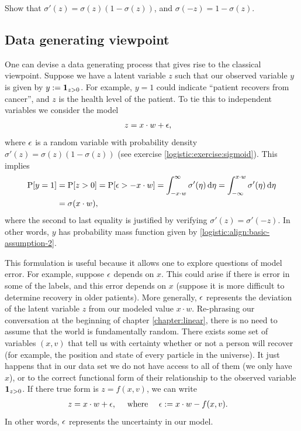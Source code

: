 \begin{exercise}
  \label{logistic:exercise:sigmoid}
  Show that $\sigma'(z) = \sigma(z)(1 - \sigma(z))$, and $\sigma(-z) = 1 - \sigma(z)$.
\end{exercise}

\subsection{Data generating viewpoint}
\label{logistic:subsection:data-generating-viewpoint}
One can devise a data generating process that gives rise to the classical viewpoint.  Suppose we have a latent variable $z$ such that our observed variable $y$ is given by $y := \mathbf{1}_{z>0}$.  For example, $y=1$ could indicate ``patient recovers from cancer'', and $z$ is the health level of the patient.  To tie this to independent variables we consider the model
\begin{align*}
  z &= x\cdot w + {\epsilon},
\end{align*}
where ${\epsilon}$ is a random variable with probability density $\sigma'(z) = \sigma(z)(1 - \sigma(z))$ (see exercise \ref{logistic:exercise:sigmoid}).  This implies
\begin{align*}
  \mathrm{P}[y = 1] &= \mathrm{P}[z > 0] = \mathrm{P}[{\epsilon} > -x\cdot w] = \int_{-x\cdot w}^\infty \sigma'(\eta){\,\mbox{d}}\eta = \int_{-\infty}^{x\cdot w}\sigma'(\eta){\,\mbox{d}}\eta\\
  &= \sigma(x\cdot w),
\end{align*}
where the second to last equality is justified by verifying $\sigma'(z) = \sigma'(-z)$.  In other words, $y$ has probability mass function given by \eqref{logistic:align:basic-assumption-2}.

This formulation is useful because it allows one to explore questions of model error.  For example, suppose ${\epsilon}$ depends on $x$.  This could arise if there is error in some of the labels, and this error depends on $x$ (suppose it is more difficult to determine recovery in older patients).  More generally, ${\epsilon}$ represents the deviation of the latent variable $z$ from our modeled value $x\cdot w$.  Re-phrasing our conversation at the beginning of chapter \ref{chapter:linear}, there is no need to assume that the world is fundamentally random.  There exists some set of variables $(x, v)$ that tell us with certainty whether or not a person will recover (for example, the position and state of every particle in the universe).  It just happens that in our data set we do not have access to all of them (we only have $x$), or to the correct functional form of their relationship to the observed variable $\mathbf{1}_{z>0}$.  If there true form is $z = f(x, v)$, we can write
\begin{align}
  \label{logistic:align:model-error}
  z &= x\cdot w + {\epsilon},\quad \mbox{ where }\quad{\epsilon} := x\cdot w - f(x,v).
\end{align}
In other words, ${\epsilon}$ represents the uncertainty in our model.



